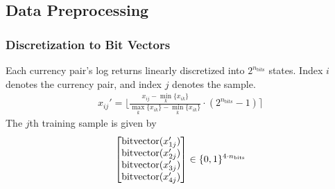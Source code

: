 \documentclass{beamer}
\begin{document}
\subsection{Data Preprocessing}
\begin{frame}
    \frametitle{Discretization to Bit Vectors}
    Each currency pair's log returns linearly discretized into \( 2^{n_\text{bits}} \) states.
    Index \( i \) denotes the currency pair, and index \( j \) denotes the sample.
    \begin{align}
        x_{ij}' = \bigg\lfloor \frac{x_{ij} - \min_k \{x_{ik}\}}{\max_k \{x_{ik}\} - \min_k \{x_{ik}\}} \cdot (2^{n_\text{bits}} - 1) \bigg\rceil
    \end{align}
    The \( j \)th training sample is given by
    \begin{align}
        \begin{bmatrix}
            \text{bitvector}(x_{1j}') \\
            \text{bitvector}(x_{2j}') \\
            \text{bitvector}(x_{3j}') \\
            \text{bitvector}(x_{4j}') \\
        \end{bmatrix}
        \in \{0,1\}^{4\cdot n_\text{bits}}
    \end{align}

\end{frame}



\end{document}
